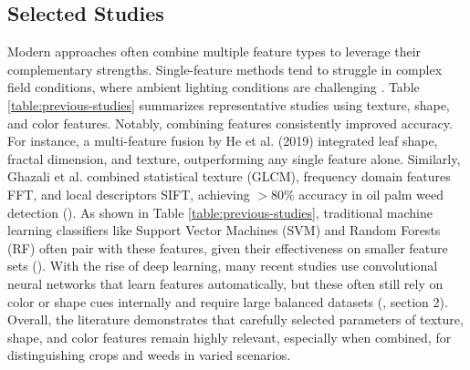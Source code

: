 \documentclass[letterpaper, notitlepage]{report}
\begin{document}
\subsection{Selected Studies}
Modern approaches often combine multiple feature types to leverage their complementary strengths. Single-feature methods tend to struggle in complex field conditions, where ambient lighting conditions are challenging \parencite{Wu2021-gt}. Table \ref{table:previous-studies} summarizes representative studies using texture, shape, and color features. Notably, combining features consistently improved accuracy. For instance, a multi-feature fusion by He et al. (2019) integrated leaf shape, fractal dimension, and texture, outperforming any single feature alone. %
Similarly, Ghazali et al. combined statistical texture (GLCM), frequency domain features \gls{FFT}, and local descriptors \gls{SIFT}, achieving $>$80\% accuracy in oil palm weed detection (\cite{Wu2021-gt}). As shown in Table \ref{table:previous-studies}, traditional machine learning classifiers like Support Vector Machines (SVM) and Random Forests (RF) often pair with these features, given their effectiveness on smaller feature sets (\cite{Wu2021-gt}). With the rise of deep learning, many recent studies use convolutional neural networks that learn features automatically, but these often still rely on color or shape cues internally and require large balanced datasets  (\cite{Wu2021-gt}, section 2). Overall, the literature demonstrates that carefully selected parameters of texture, shape, and color features remain highly relevant, especially when combined, for distinguishing crops and weeds in varied scenarios.
\end{document}
